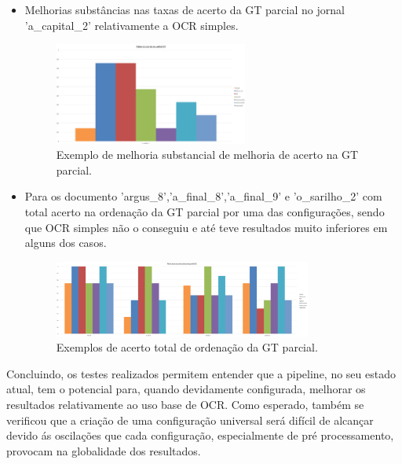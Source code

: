 \begin{itemize}
	\item Melhorias substâncias nas taxas de acerto da GT parcial no jornal 'a\_capital\_2' relativamente a OCR simples.
	
	\begin{figure}[H]
		\centering
		\includegraphics[width=0.6\textwidth]{images/resultados/local_example_pgt_hit_ratio_1.png}
		\caption{Exemplo de melhoria substancial de melhoria de acerto na GT parcial.}
		\label{fig:local_example_pgt_hit_ratio_1}
	\end{figure}
	
	\item Para os documento 'argus\_8','a\_final\_8','a\_final\_9' e 'o\_sarilho\_2' com total acerto na ordenação da GT parcial por uma das configurações, sendo que OCR simples não o conseguiu e até teve resultados muito inferiores em alguns dos casos.
	
	\begin{figure}[H]
		\centering
		\includegraphics[width=0.8\textwidth]{images/resultados/local_example_pgt_correct_order_ratio_2.png}
		\caption{Exemplos de acerto total de ordenação da GT parcial.}
		\label{fig:local_example_pgt_correct_order_ratio_2}
	\end{figure}
	
\end{itemize}



Concluindo, os testes realizados permitem entender que a pipeline, no seu estado atual, tem o potencial para, quando devidamente configurada, melhorar os resultados relativamente ao uso base de OCR. Como esperado, também se verificou que a criação de uma configuração universal será difícil de alcançar devido ás oscilações que cada configuração, especialmente de pré processamento, provocam na globalidade dos resultados. 

